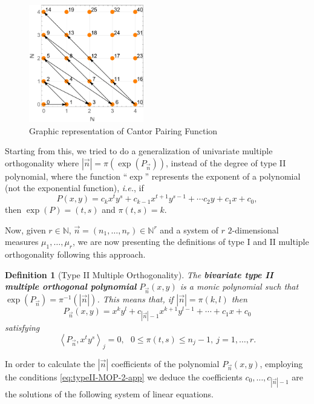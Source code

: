 \documentclass[12pt,a4]{report}
\theoremstyle{plain}
\newtheorem{definition}[theorem]{Definition}
\newcommand{\N}[0]{\mathbb{N}}
\newcommand{\prodesc}[2]{\left\langle #1 , #2 \right\rangle}
\begin{document}
\begin{figure}[h]
    \centering\includegraphics[width=5cm]{./img/Cantor.png}
    \caption{Graphic representation of Cantor Pairing Function}
    \label{fig:Cantor}
  \end{figure}

Starting from this, we tried to do a generalization of univariate multiple orthogonality where $|\vec n| = \pi(\exp(P_{\vec n}))$, instead of the degree of type II polynomial, where the function ``$\exp$'' represents the exponent of a polynomial (not the exponential function), \textit{i.e.}, if $$P(x,y)= c_{k} x^t y^s + c_{k-1} x^{t+1} y^{s-1} + \cdots c_2 y + c_1 x + c_0,$$ then $\exp(P)=(t,s)$ and $\pi(t,s)=k$. %

Now, given $r\in\N$, $\vec n = (n_1,\dots, n_r)\in\N^r$ and a system of $r$ $2$-dimensional measures $\mu_1, \dots, \mu_r$, we are now presenting the definitions of type I and II multiple orthogonality following this approach. 

\begin{definition}[Type II Multiple Orthogonality]
  The \textbf{bivariate type II multiple orthogonal polynomial} $P_{\vec n}(x,y)$ is a monic polynomial such that $\exp(P_{\vec n})=\pi^{-1}(|\vec n|)$. This means that, if $|\vec n|=\pi(k,l)$ then 
  $$
    P_{\vec n}(x,y) = x^k y^l + c_{|\vec n|-1} x^{k+1} y^{l-1} + \cdots + c_1 x + c_0
  $$
  satisfying
  \begin{equation}
    \label{eq:typeII-MOP-2-app}
    \prodesc{P_{\vec n}}{x^t y^s}_j = 0, \ \ \ 0\leq \pi(t,s)\leq n_j-1, \ j=1,\dots,r.
  \end{equation}    
\end{definition}

In order to calculate the $|\vec n|$ coefficients of the polynomial $P_{\vec n}(x,y)$, employing the conditions \eqref{eq:typeII-MOP-2-app} we deduce the coefficients $c_0,\dots,c_{|\vec n|-1}$ are the solutions of the following system of linear equations.
\end{document}
